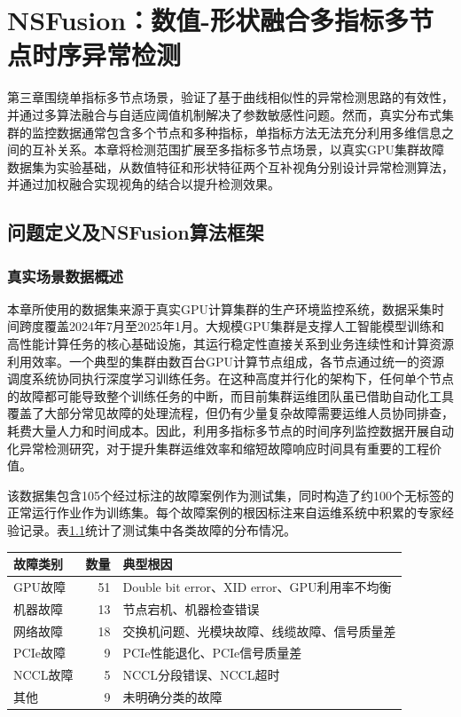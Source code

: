 \chapter{NSFusion：数值-形状融合多指标多节点时序异常检测}\label{chap:multi_metric}

第三章围绕单指标多节点场景，验证了基于曲线相似性的异常检测思路的有效性，并通过多算法融合与自适应阈值机制解决了参数敏感性问题。然而，真实分布式集群的监控数据通常包含多个节点和多种指标，单指标方法无法充分利用多维信息之间的互补关系。本章将检测范围扩展至多指标多节点场景，以真实GPU集群故障数据集为实验基础，从数值特征和形状特征两个互补视角分别设计异常检测算法，并通过加权融合实现视角的结合以提升检测效果。

\section{问题定义及NSFusion算法框架}

\subsection{真实场景数据概述}

本章所使用的数据集来源于真实GPU计算集群的生产环境监控系统，数据采集时间跨度覆盖2024年7月至2025年1月。大规模GPU集群是支撑人工智能模型训练和高性能计算任务的核心基础设施，其运行稳定性直接关系到业务连续性和计算资源利用效率。一个典型的集群由数百台GPU计算节点组成，各节点通过统一的资源调度系统协同执行深度学习训练任务。在这种高度并行化的架构下，任何单个节点的故障都可能导致整个训练任务的中断，而目前集群运维团队虽已借助自动化工具覆盖了大部分常见故障的处理流程，但仍有少量复杂故障需要运维人员协同排查，耗费大量人力和时间成本。因此，利用多指标多节点的时间序列监控数据开展自动化异常检测研究，对于提升集群运维效率和缩短故障响应时间具有重要的工程价值。

该数据集包含105个经过标注的故障案例作为测试集，同时构造了约100个无标签的正常运行作业作为训练集。每个故障案例的根因标注来自运维系统中积累的专家经验记录。表\ref{tab:fault_category}统计了测试集中各类故障的分布情况。

\begin{table}[htbp]
    \centering
    \label{tab:fault_category}
    \begin{tabular}{lrl}
        \toprule
        故障类别 & 数量 & 典型根因 \\
        \midrule
        GPU故障 & 51 & Double bit error、XID error、GPU利用率不均衡 \\
        机器故障 & 13 & 节点宕机、机器检查错误 \\
        网络故障 & 18 & 交换机问题、光模块故障、线缆故障、信号质量差 \\
        PCIe故障 & 9 & PCIe性能退化、PCIe信号质量差 \\
        NCCL故障 & 5 & NCCL分段错误、NCCL超时 \\
        其他 & 9 & 未明确分类的故障 \\
        \bottomrule
    \end{tabular}
\end{table}

